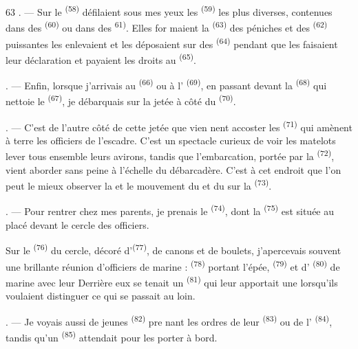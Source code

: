 \begin{VUpage}[65]{63}
. --- Sur le  \textsuperscript{(58)} défilaient sous mes yeux les\nl
{} \textsuperscript{(59)} les plus diverses, contenues dans\nl
des  \textsuperscript{(60)} ou dans des  \textsuperscript{61)}. Elles for\cc
maient la  \textsuperscript{(63)} des péniches et des \textsuperscript{(62)}\nl
puissantes les enlevaient et les déposaient sur des\nl
{} \textsuperscript{(64)} pendant que les  faisaient\nl
leur déclaration et payaient les droits au \nl
{} \textsuperscript{(65)}.

. --- Enfin, lorsque j'arrivais au \cc
{} \textsuperscript{(66)} ou à l' \textsuperscript{(69)}, en passant devant la\nl
{} \textsuperscript{(68)} qui nettoie le  \textsuperscript{(67)}, je débarquais sur\nl
la jetée à côté du  \textsuperscript{(70)}.

. --- C'est de l'autre côté de cette jetée que vien\cc
nent accoster les  \textsuperscript{(71)} qui amènent à terre\nl
les officiers de l'escadre. C'est un spectacle curieux de\nl
voir les matelots lever tous ensemble leurs avirons,\nl
tandis que l'embarcation, portée par la  \textsuperscript{(72)},\nl
vient aborder sans peine à l'échelle du débarcadère.\nl
C'est à cet endroit que l'on peut le mieux observer la\nl
{} et le mouvement du  et du  sur la\nl
{} \textsuperscript{(73)}.

. --- Pour rentrer chez mes parents, je prenais le\nl
{} \textsuperscript{(74)}, dont la  \textsuperscript{(75)} est située\nl
au  placé devant le cercle des officiers.

Sur le  \textsuperscript{(76)} du cercle, décoré d'\textsuperscript{(77)},\nl
de canons et de boulets, j'apercevais souvent une\nl
brillante réunion d'officiers de marine : \nl
{} \textsuperscript{(78)} portant l'épée, \cc
{} \textsuperscript{(79)} et d' \textsuperscript{(80)} de marine avec leur\nl
{} Derrière eux se tenait un  \textsuperscript{(81)} qui\nl
leur apportait une  lorsqu'ils\nl
voulaient distinguer ce qui se passait au loin.

. --- Je voyais aussi de jeunes  \textsuperscript{(82)} pre\cc
nant les ordres de leur  \textsuperscript{(83)}\nl
ou de l' \textsuperscript{(84)}, tandis qu'un \textsuperscript{(85)}\nl
attendait pour les porter à bord.
\end{VUpage}

